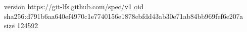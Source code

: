 version https://git-lfs.github.com/spec/v1
oid sha256:d791b6aa640ef4970c1e7740156e1878ebfdd43ab30e71ab84bb969fef6e207a
size 124592
